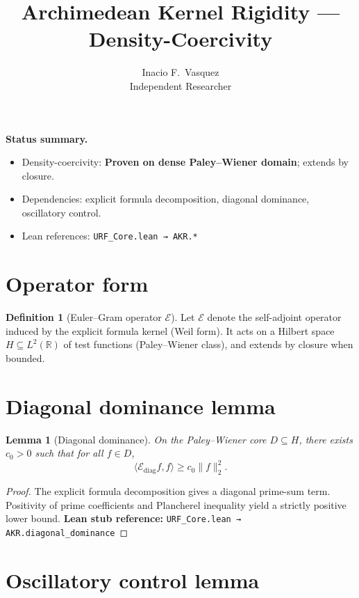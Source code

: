 \documentclass[11pt]{article}
\title{\textbf{Archimedean Kernel Rigidity — Density-Coercivity}}
\author{Inacio F.\ Vasquez \\ Independent Researcher}
\date{}
\theoremstyle{plain}
\newtheorem{lemma}[theorem]{Lemma}
\theoremstyle{definition}
\newtheorem{definition}[theorem]{Definition}
\theoremstyle{remark}
\newcommand{\cE}{\mathcal{E}}
\newcommand{\R}{\mathbb{R}}
\begin{document}
\maketitle

\begin{center}
\textbf{Status summary.}
\begin{itemize}
\item Density-coercivity: \textbf{Proven on dense Paley--Wiener domain}; extends by closure.
\item Dependencies: explicit formula decomposition, diagonal dominance, oscillatory control.
\item Lean references: \texttt{URF\_Core.lean → AKR.*}
\end{itemize}
\end{center}

\tableofcontents

\section{Operator form}

\begin{definition}[Euler--Gram operator $\cE$]
Let $\cE$ denote the self-adjoint operator induced by the explicit formula kernel (Weil form). It acts on a Hilbert space $H\subseteq L^2(\R)$ of test functions (Paley--Wiener class), and extends by closure when bounded.
\end{definition}

\section{Diagonal dominance lemma}

\begin{lemma}[Diagonal dominance]\label{lem:akr-diagonal}
On the Paley--Wiener core $D\subseteq H$, there exists $c_0>0$ such that for all $f\in D$,
\[
\langle \cE_{\mathrm{diag}} f,f\rangle \ge c_0 \|f\|_2^2.
\]
\end{lemma}

\begin{proof}
The explicit formula decomposition gives a diagonal prime-sum term.  
Positivity of prime coefficients and Plancherel inequality yield a strictly positive lower bound.  
\textbf{Lean stub reference:} \texttt{URF\_Core.lean → AKR.diagonal\_dominance}
\end{proof}

\section{Oscillatory control lemma}
\end{document}

